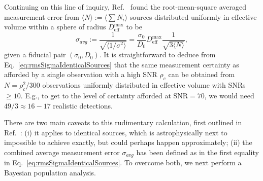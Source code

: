 \documentclass[aps,prd,amsmath,floats,floatfix, twocolumn,
superscriptaddress,nofootinbib,showpacs]{revtex4-1}
\newcommand{\D}{\mathrm{d}}
\newcommand{\deff}{D_\mathrm{eff}}
\begin{document}
Continuing on this line of inquiry, Ref.~\cite{Markakis:2010mp} found the 
root-mean-square averaged measurement error from 
$\langle N\rangle:=\langle\sum N_i\rangle$ sources distributed uniformly in
effective volume within a sphere of radius $\deff^\mathrm{max}$ to be
\begin{equation}\label{eq:rmsSigmaIdenticalSources}
 \sigma_{avg} := \frac{1}{\sqrt{\langle1/\sigma^{2}\rangle}} = \frac{\sigma_0}{D_0} \deff^\mathrm{max} \frac{1}{\sqrt{3\langle N\rangle}},
\end{equation}
given a fiducial pair $(\sigma_0, D_0)$. It is straightforward to deduce from
Eq.~\ref{eq:rmsSigmaIdenticalSources}
that the same measurement certainty as afforded by a single
observation with a high SNR $\rho_c$ can be obtained from $N = \rho_c^2/300$ observations
uniformly distributed in effective volume with SNRs $\geq 10$. E.g., to get to the level 
of certainty afforded at SNR$=70$, we would need $49/3\approx 16-17$ realistic detections.

There are two main caveats to this rudimentary calculation, first outlined in 
Ref.~\cite{Markakis:2010mp}: (i) it applies to identical sources,
which is astrophysically next to impossible to achieve exactly, but could perhaps happen 
approximately; (ii) the combined average measurement error $\sigma_{avg}$ has been defined
as in the first equality in Eq.~\ref{eq:rmsSigmaIdenticalSources}. To overcome both,
we next perform a Bayesian population analysis.
\end{document}
